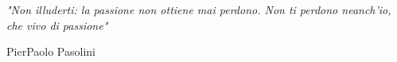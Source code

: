 


\begin{flushright}
\itshape
\null
\vfill
"Non illuderti: la passione non ottiene mai perdono. Non ti perdono neanch’io, che vivo di passione"

PierPaolo Pasolini
\vfill
\null
\end{flushright}


